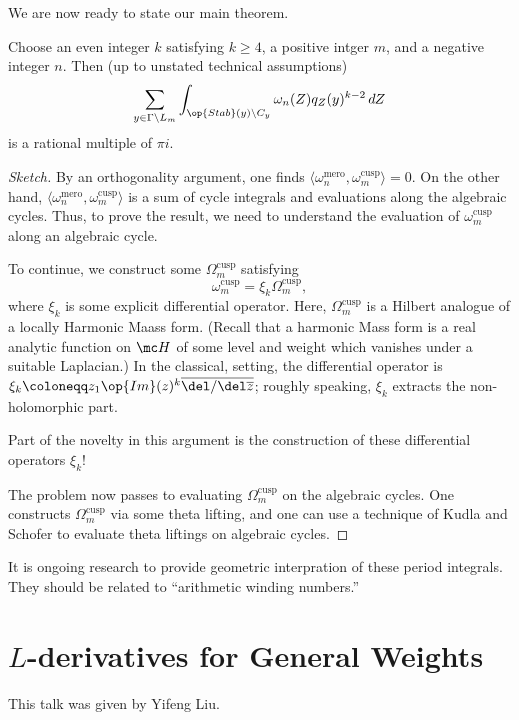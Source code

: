 \documentclass{article}
\begin{document}
We are now ready to state our main theorem.
\begin{theorem}
	Choose an even integer $k$ satisfying $k\ge4$, a positive intger $m$, and a negative integer $n$. Then (up to unstated technical assumptions)
	\[\sum_{y\in\Gamma\backslash L_m}\int_{\op{Stab}(y)\backslash C_y}\omega_n(Z)q_Z(y)^{k-2}\,dZ\]
	is a rational multiple of $\pi i$.
\end{theorem}
\begin{proof}[Sketch]
	By an orthogonality argument, one finds $\langle\omega_n^{\mathrm{mero}},\omega_m^{\mathrm{cusp}}\rangle=0$. On the other hand,  $\langle\omega_n^{\mathrm{mero}},\omega_m^{\mathrm{cusp}}\rangle$ is a sum of cycle integrals and evaluations along the algebraic cycles. Thus, to prove the result, we need to understand the evaluation of $\omega_m^{\mathrm{cusp}}$ along an algebraic cycle.

	To continue, we construct some $\Omega_m^{\mathrm{cusp}}$ satisfying
	\[\omega_m^{\mathrm{cusp}}=\xi_k\Omega_m^{\mathrm{cusp}},\]
	where $\xi_k$ is some explicit differential operator. Here, $\Omega_m^{\mathrm{cusp}}$ is a Hilbert analogue of a locally Harmonic Maass form. (Recall that a harmonic Mass form is a real analytic function on $\mc H$ of some level and weight which vanishes under a suitable Laplacian.) In the classical, setting, the differential operator is $\xi_k\coloneqq z_1\op{Im}(z)^k\overline{\del/\del\overline z}$; roughly speaking, $\xi_k$ extracts the non-holomorphic part.
	\begin{remark}
		Part of the novelty in this argument is the construction of these differential operators $\xi_k$!
	\end{remark}
	The problem now passes to evaluating $\Omega_m^{\mathrm{cusp}}$ on the algebraic cycles. One constructs $\Omega_m^{\mathrm{cusp}}$ via some theta lifting, and one can use a technique of Kudla and Schofer to evaluate theta liftings on algebraic cycles.
\end{proof}
It is ongoing research to provide geometric interpration of these period integrals. They should be related to ``arithmetic winding numbers.''

\section{\texorpdfstring{$L$}{ L}-derivatives for General Weights}
This talk was given by Yifeng Liu.
\end{document}
